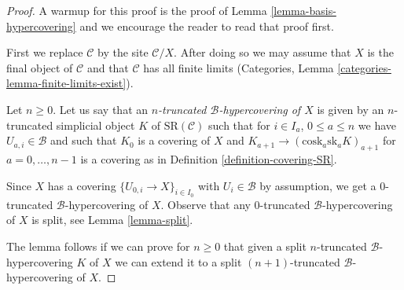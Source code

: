 \documentclass[10pt,a4paper]{amsart}
\theoremstyle{plain}
\theoremstyle{definition}
\theoremstyle{remark}
\numberwithin{equation}{subsection}
\begin{document}
\begin{proof}
A warmup for this proof is the proof of
Lemma \ref{lemma-basis-hypercovering} and
we encourage the reader to read that proof first.

\medskip\noindent
First we replace $\mathcal{C}$ by the site $\mathcal{C}/X$.
After doing so we may assume that $X$ is the final object
of $\mathcal{C}$ and that $\mathcal{C}$ has all finite limits
(Categories, Lemma \ref{categories-lemma-finite-limits-exist}).

\medskip\noindent
Let $n \geq 0$. Let us say that an
{\it $n$-truncated $\mathcal{B}$-hypercovering of $X$}
is given by an $n$-truncated simplicial object $K$
of $\text{SR}(\mathcal{C})$
such that for $i \in I_a$, $0 \leq a \leq n$
we have $U_{a, i} \in \mathcal{B}$ and such that
$K_0$ is a covering of $X$ and
$K_{a + 1} \to (\text{cosk}_a \text{sk}_a K)_{a + 1}$
for $a = 0, \ldots, n - 1$
is a covering as in Definition \ref{definition-covering-SR}.

\medskip\noindent
Since $X$ has a covering $\{U_{0, i} \to X\}_{i \in I_0}$
with $U_i \in \mathcal{B}$ by assumption, we get a $0$-truncated
$\mathcal{B}$-hypercovering of $X$. Observe that any $0$-truncated
$\mathcal{B}$-hypercovering of $X$ is split, see
Lemma \ref{lemma-split}.

\medskip\noindent
The lemma follows if we can prove for $n \geq 0$ that given a
split $n$-truncated $\mathcal{B}$-hypercovering $K$ of $X$
we can extend it to a
split $(n + 1)$-truncated $\mathcal{B}$-hypercovering of $X$.


\end{proof}
\end{document}
